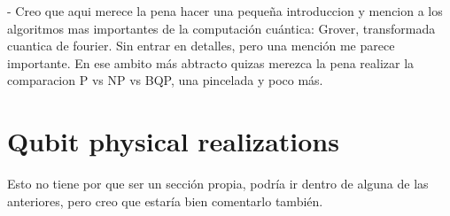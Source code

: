 - Creo que aqui merece la pena hacer una pequeña introduccion y mencion a los algoritmos mas importantes de la computación cuántica: Grover, transformada cuantica de fourier. Sin entrar en detalles, pero una mención me parece importante. En ese ambito más abtracto quizas merezca la pena realizar la comparacion P vs NP vs BQP, una pincelada y poco más.


\section{Qubit physical realizations}

Esto no tiene por que ser un sección propia, podría ir dentro de alguna de las anteriores, pero creo que estaría bien comentarlo también.


